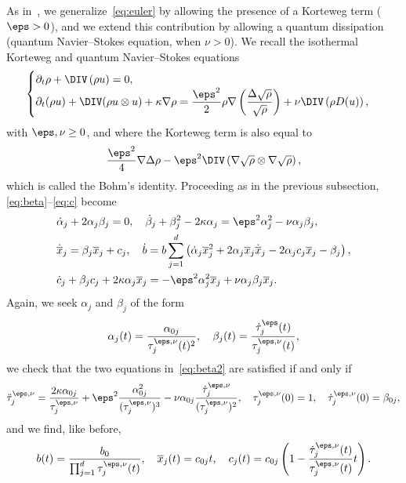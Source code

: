 As in~\cite{CFY17}, we generalize~\eqref{eq:euler} by allowing the presence of a Korteweg term ($\eps>0$), and we extend this contribution by allowing a quantum dissipation (quantum Navier--Stokes equation, when $\nu>0$). We recall the isothermal Korteweg and quantum Navier--Stokes equations
\begin{equation}\label{eq:korteweg}
\begin{cases}
\partial_t \rho+\DIV\left(\rho u\right)=0,\\
\partial_t (\rho u) +\DIV(\rho u\otimes u)+\kappa \nabla
\rho= \dfrac{\eps^2}{2}\rho\nabla\left(\dfrac{\Delta
\sqrt{\rho}}{\sqrt{\rho}}\right)+\nu \DIV \left(\rho D(u)\right),
\end{cases}
\end{equation}
with $\eps,\nu\ge 0$, and where the Korteweg term is also equal to
\[
\frac{\eps^2}{4}\nabla \Delta
\rho -\eps^2\DIV\left(\nabla\sqrt\rho\otimes\nabla \sqrt\rho\right),
\]
which is called the Bohm's identity. Proceeding as in the previous subsection, \eqref{eq:beta}--\eqref{eq:c} become
\begin{equation}
\begin{aligned}
& \dot \alpha_j +2\alpha_j \beta_j=0, \quad
\dot\beta_j +\beta_j^2-2\kappa \alpha_j=\eps^2
\alpha_j^2-\nu \alpha_j\beta_j, \label{eq:beta2}
\\
& \dot{\overline x}_j = \beta_j \overline x_j +c_j,\quad
\dot b = b\sum_{j=1}^d \left(\dot \alpha_j {\overline x}_j^2+2
\alpha_j{\overline x}_j\dot{\overline x}_j -2\alpha_j c_j \overline x_j -\beta_j \right),\\
& \dot c_j +\beta_j c_j +2\kappa \alpha_j \overline x_j = -\eps^2\alpha_j^2 \overline x_j+\nu \alpha_j\beta_j\overline x_j.
\end{aligned}
\end{equation}
Again, we seek $\alpha_j$ and $\beta_j$ of the form
\begin{equation*}
\alpha_j(t) =\frac{\alpha_{0j}}{\tau_j^{\eps,\nu}(t)^2},\quad \beta_j(t) =
\frac{\dot \tau^\eps_j(t)}{\tau^{\eps,\nu}_j(t)},
\end{equation*}
we check that the two equations in~\eqref{eq:beta2} are satisfied if and only if
\begin{equation}\label{eq:tauj-quant}
\ddot \tau^{\eps,\nu}_j =
\frac{2\kappa
\alpha_{0j}}{\tau^{\eps,\nu}_j}+\eps^2\frac{\alpha_{0j}^2}{(\tau^{\eps,\nu}_j)^3}-\nu
\alpha_{0j}\frac{\dot \tau^{\eps,\nu}_j}{(\tau^{\eps,\nu}_j)^2},\quad
\tau^{\eps,\nu}_j(0)=1,\quad \dot \tau^{\eps,\nu}_j(0)=\beta_{0j},
\end{equation}
and we find, like before,
\begin{equation*}
b(t)=\frac{b_0}{\prod_{j=1}^d \tau^{\eps,\nu}_j(t)},\quad
\overline x_j(t)= c_{0j}t,\quad c_j(t) =c_{0j}\left(1-\frac{\dot
\tau^{\eps,\nu}_j(t)}{\tau^{\eps,\nu}_j(t)}t\right).
\end{equation*}


